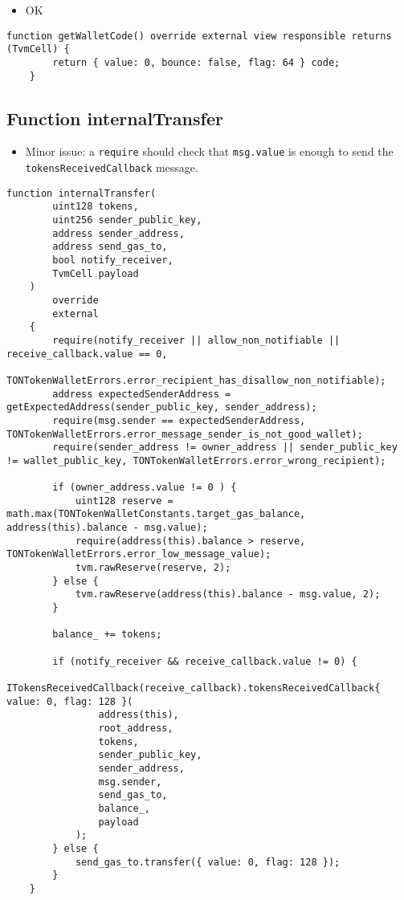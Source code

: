 \begin{itemize}
\item OK
\end{itemize}

\begin{lstlisting}[firstnumber=87]
    function getWalletCode() override external view responsible returns (TvmCell) {
        return { value: 0, bounce: false, flag: 64 } code;
    }
\end{lstlisting}

\subsection{Function internalTransfer}

\begin{itemize}
\item Minor issue: a {\tt require} should check that {\tt msg.value}
  is enough to send the {\tt tokensReceivedCallback} message.
\end{itemize}

\begin{lstlisting}[firstnumber=370]
    function internalTransfer(
        uint128 tokens,
        uint256 sender_public_key,
        address sender_address,
        address send_gas_to,
        bool notify_receiver,
        TvmCell payload
    )
        override
        external
    {
        require(notify_receiver || allow_non_notifiable || receive_callback.value == 0,
                TONTokenWalletErrors.error_recipient_has_disallow_non_notifiable);
        address expectedSenderAddress = getExpectedAddress(sender_public_key, sender_address);
        require(msg.sender == expectedSenderAddress, TONTokenWalletErrors.error_message_sender_is_not_good_wallet);
        require(sender_address != owner_address || sender_public_key != wallet_public_key, TONTokenWalletErrors.error_wrong_recipient);

        if (owner_address.value != 0 ) {
            uint128 reserve = math.max(TONTokenWalletConstants.target_gas_balance, address(this).balance - msg.value);
            require(address(this).balance > reserve, TONTokenWalletErrors.error_low_message_value);
            tvm.rawReserve(reserve, 2);
        } else {
            tvm.rawReserve(address(this).balance - msg.value, 2);
        }

        balance_ += tokens;

        if (notify_receiver && receive_callback.value != 0) {
            ITokensReceivedCallback(receive_callback).tokensReceivedCallback{ value: 0, flag: 128 }(
                address(this),
                root_address,
                tokens,
                sender_public_key,
                sender_address,
                msg.sender,
                send_gas_to,
                balance_,
                payload
            );
        } else {
            send_gas_to.transfer({ value: 0, flag: 128 });
        }
    }
\end{lstlisting}

